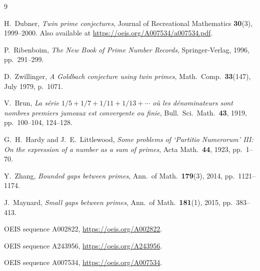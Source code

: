 \documentclass[12pt]{amsart}
\theoremstyle{definition}
\begin{document}
\begin{thebibliography}{9}

H.~Dubner,
\emph{Twin prime conjectures},
Journal of Recreational Mathematics \textbf{30}(3), 1999--2000.
Also available at \url{https://oeis.org/A007534/a007534.pdf}.

P.~Ribenboim,
\emph{The New Book of Prime Number Records},
Springer-Verlag, 1996, pp.~291--299.

D.~Zwillinger,
\emph{A Goldbach conjecture using twin primes},
Math.\ Comp.\ \textbf{33}(147), July 1979, p.~1071.

V.~Brun,
\emph{La s\'{e}rie $1/5 + 1/7 + 1/11 + 1/13 + \cdots$ o\`{u} les d\'{e}nominateurs
sont nombres premiers jumeaux est convergente ou finie},
Bull.\ Sci.\ Math.\ \textbf{43}, 1919, pp.~100--104, 124--128.

G.~H.~Hardy and J.~E.~Littlewood,
\emph{Some problems of `Partitio Numerorum' III: On the expression of a number as
a sum of primes},
Acta Math.\ \textbf{44}, 1923, pp.~1--70.

Y.~Zhang,
\emph{Bounded gaps between primes},
Ann.\ of Math.\ \textbf{179}(3), 2014, pp.~1121--1174.

J.~Maynard,
\emph{Small gaps between primes},
Ann.\ of Math.\ \textbf{181}(1), 2015, pp.~383--413.

OEIS sequence A002822,
\url{https://oeis.org/A002822}.

OEIS sequence A243956,
\url{https://oeis.org/A243956}.

OEIS sequence A007534,
\url{https://oeis.org/A007534}.

\end{thebibliography}
\end{document}
